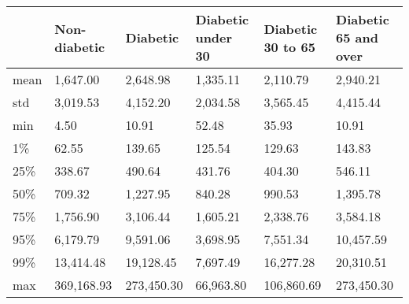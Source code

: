 \begin{tabular}{llllll}
\toprule
{} & Non-diabetic &    Diabetic & Diabetic under 30 & Diabetic 30 to 65 & Diabetic 65 and over \\
\midrule
mean &     1,647.00 &    2,648.98 &          1,335.11 &          2,110.79 &             2,940.21 \\
std  &     3,019.53 &    4,152.20 &          2,034.58 &          3,565.45 &             4,415.44 \\
min  &         4.50 &       10.91 &             52.48 &             35.93 &                10.91 \\
1\%   &        62.55 &      139.65 &            125.54 &            129.63 &               143.83 \\
25\%  &       338.67 &      490.64 &            431.76 &            404.30 &               546.11 \\
50\%  &       709.32 &    1,227.95 &            840.28 &            990.53 &             1,395.78 \\
75\%  &     1,756.90 &    3,106.44 &          1,605.21 &          2,338.76 &             3,584.18 \\
95\%  &     6,179.79 &    9,591.06 &          3,698.95 &          7,551.34 &            10,457.59 \\
99\%  &    13,414.48 &   19,128.45 &          7,697.49 &         16,277.28 &            20,310.51 \\
max  &   369,168.93 &  273,450.30 &         66,963.80 &        106,860.69 &           273,450.30 \\
\bottomrule
\end{tabular}
